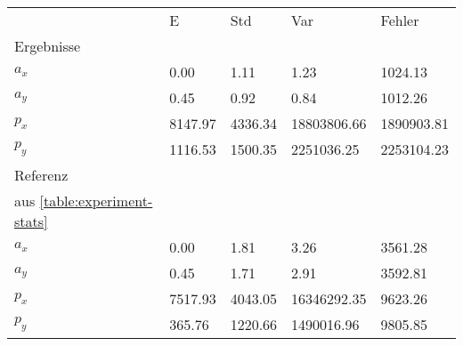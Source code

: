 \begin{tabular}{l|l|l|l|l}

     & E   & Std    & Var    & Fehler \\
\hhline{=|=|=|=|=}

Ergebnisse & & & & \\
$a_x$  &         0.00 &         1.11 &         1.23 &      1024.13 \\
$a_y$  &         0.45 &         0.92 &         0.84 &      1012.26 \\
$p_x$  &      8147.97 &      4336.34 &  18803806.66 &   1890903.81 \\
$p_y$  &      1116.53 &      1500.35 &   2251036.25 &   2253104.23 \\

\hline
Referenz & & & & \\
aus \ref{table:experiment-stats} & & & & \\
$a_x$  &         0.00 &         1.81 &         3.26 &      3561.28 \\
$a_y$  &         0.45 &         1.71 &         2.91 &      3592.81 \\
$p_x$  &      7517.93 &      4043.05 &  16346292.35 &      9623.26 \\
$p_y$  &       365.76 &      1220.66 &   1490016.96 &      9805.85 \\
\end{tabular}
